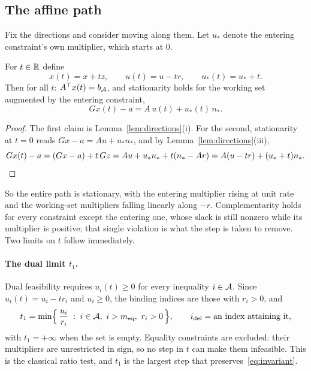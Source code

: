 \subsection{The affine path}

Fix the directions and consider moving along them. Let $u_*$ denote the entering
constraint's own multiplier, which starts at $0$.

\begin{proposition}\label{prop:path}
For $t \in \mathbb{R}$ define
\begin{equation}
  x(t) = x + t z, \qquad u(t) = u - t r, \qquad u_*(t) = u_* + t .
  \label{eq:path}
\end{equation}
Then for all $t$: $A^{\top} x(t) = b_{\mathcal{A}}$, and stationarity holds for the working
set augmented by the entering constraint,
\begin{equation}
  G x(t) - a = A\, u(t) + u_*(t)\, n_* .
  \label{eq:pathstat}
\end{equation}
\end{proposition}

\begin{proof}
The first claim is Lemma~\ref{lem:directions}(i). For the second, stationarity at
$t = 0$ reads $Gx - a = Au + u_* n_*$, and by Lemma~\ref{lem:directions}(iii),
\[
  Gx(t) - a = (Gx - a) + t\,Gz
  = A u + u_* n_* + t(n_* - Ar)
  = A(u - tr) + (u_* + t) n_* . \qedhere
\]
\end{proof}

So the entire path is stationary, with the entering multiplier rising at unit rate
and the working-set multipliers falling linearly along $-r$. Complementarity holds
for every constraint except the entering one, whose slack is still nonzero while
its multiplier is positive; that single violation is what the step is taken to
remove. Two limits on $t$ follow immediately.

\paragraph{The dual limit $t_1$.} Dual feasibility requires $u_i(t) \ge 0$ for
every inequality $i \in \mathcal{A}$. Since $u_i(t) = u_i - t r_i$ and $u_i \ge 0$, the
binding indices are those with $r_i > 0$, and
\begin{equation}
  t_1 = \min\Bigl\{\, \frac{u_i}{r_i} \;:\; i \in \mathcal{A},\ i > m_{\mathrm{eq}},\
  r_i > 0 \,\Bigr\},
  \qquad
  i_{\mathrm{del}} = \text{an index attaining it},
  \label{eq:t1}
\end{equation}
with $t_1 = +\infty$ when the set is empty. Equality constraints are excluded:
their multipliers are unrestricted in sign, so no step in $t$ can make them
infeasible. This is the classical ratio test, and $t_1$ is the largest step that
preserves~\eqref{eq:invariant}.


